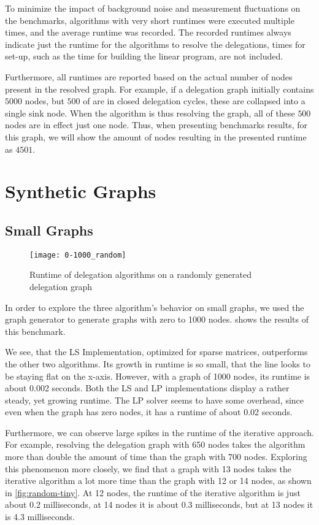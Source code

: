 To minimize the impact of background noise and measurement fluctuations on the benchmarks, algorithms with very short runtimes were executed multiple times, and the average runtime was recorded. The recorded runtimes always indicate just the runtime for the algorithms to resolve the delegations, times for set-up, such as the time for building the linear program, are not included. 

Furthermore, all runtimes are reported based on the actual number of nodes present in the resolved graph. For example, if a delegation graph initially contains $5000$ nodes, but $500$ of are in closed delegation cycles, these are collapsed into a single sink node. 
When the algorithm is thus resolving the graph, all of these $500$ nodes are in effect just one node. Thus, when presenting benchmarks results, for this graph, we will show the amount of nodes resulting in the presented runtime as $4501$. 

\section{Synthetic Graphs}
\label{sec:synthetic_graphs}

\subsection{Small Graphs}
\label{subsec:small_graphs}

\begin{figure}[t]
    \centering
    \texttt{[image: 0-1000\_random]}
    \caption{Runtime of delegation algorithms on a randomly generated delegation graph}
    \label{fig:random-small}
\end{figure}

In order to explore the three algorithm's behavior on small graphs, we used the graph generator to generate graphs with zero to 1000 nodes.  shows the results of this benchmark.

We see, that the \ac{LS} Implementation, optimized for sparse matrices, outperforms the other two algorithms. Its growth in runtime is so small, that the line looks to be staying flat on the x-axis. However, with a graph of 1000 nodes, its runtime is about 0.002 seconds. Both the LS and LP implementations display a rather steady, yet growing runtime. The LP solver seems to have some overhead, since even when the graph has zero nodes, it has a runtime of about 0.02 seconds.

Furthermore, we can observe large spikes in the runtime of the iterative approach. For example, resolving the delegation graph with 650 nodes takes the algorithm more than double the amount of time than the graph with 700 nodes. Exploring this phenomenon more closely, we find that a graph with 13 nodes takes the iterative algorithm a lot more time than the graph with 12 or 14 nodes, as shown in \cref{fig:random-tiny}. At 12 nodes, the runtime of the iterative algorithm is just about 0.2 milliseconds, at 14 nodes it is about 0.3 milliseconds, but at 13 nodes it is 4.3 milliseconds. 


